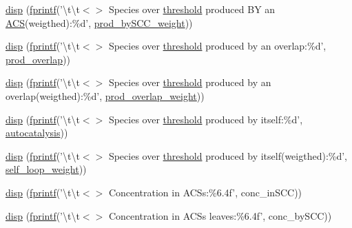 \begin{DoxyCompactItemize}
\item 
\hyperlink{a00022_a41b4972e38813d1f738a978731ed2af8}{disp} (\hyperlink{a00062_aa6dc40efe43a338c9ff278260d95b4d9}{fprintf}('\textbackslash{}t\textbackslash{}t$<$$>$ Species over \hyperlink{a00030_aa022cbb28f80299d572def08e7a5ccfd}{threshold} produced B\-Y an \hyperlink{a00022_ad72e1068795c577213481e5db7f3e925}{A\-C\-S}(weigthed)\-:\%d', \hyperlink{a00022_aac9f4f22f537f0fc5fd69163676333af}{prod\-\_\-by\-S\-C\-C\-\_\-weight}))
\item 
\hyperlink{a00022_a752b7252b1ef2602fab9837af43329ea}{disp} (\hyperlink{a00062_aa6dc40efe43a338c9ff278260d95b4d9}{fprintf}('\textbackslash{}t\textbackslash{}t$<$$>$ Species over \hyperlink{a00030_aa022cbb28f80299d572def08e7a5ccfd}{threshold} produced by an overlap\-:\%d', \hyperlink{a00022_a0aa4c3fee8d2729e5b7aa511a3100685}{prod\-\_\-overlap}))
\item 
\hyperlink{a00022_ad632c0885d2430334c173c9a51a44dcb}{disp} (\hyperlink{a00062_aa6dc40efe43a338c9ff278260d95b4d9}{fprintf}('\textbackslash{}t\textbackslash{}t$<$$>$ Species over \hyperlink{a00030_aa022cbb28f80299d572def08e7a5ccfd}{threshold} produced by an overlap(weigthed)\-:\%d', \hyperlink{a00022_a75fbcaf1e595fc3264e0cba051e4ba02}{prod\-\_\-overlap\-\_\-weight}))
\item 
\hyperlink{a00022_a8daa491270543da374f7184e009ca072}{disp} (\hyperlink{a00062_aa6dc40efe43a338c9ff278260d95b4d9}{fprintf}('\textbackslash{}t\textbackslash{}t$<$$>$ Species over \hyperlink{a00030_aa022cbb28f80299d572def08e7a5ccfd}{threshold} produced by itself\-:\%d', \hyperlink{a00022_a2d0b5f62c8a18e8cbfeb15c6f8856c5a}{autocatalysis}))
\item 
\hyperlink{a00022_a9cf4fc8861436a09b1fb6433963b32c4}{disp} (\hyperlink{a00062_aa6dc40efe43a338c9ff278260d95b4d9}{fprintf}('\textbackslash{}t\textbackslash{}t$<$$>$ Species over \hyperlink{a00030_aa022cbb28f80299d572def08e7a5ccfd}{threshold} produced by itself(weigthed)\-:\%d', \hyperlink{a00022_a8c1a84735122e25dcd5f68a0bf4c312b}{self\-\_\-loop\-\_\-weight}))
\item 
\hyperlink{a00022_a72f8ddb8fbf3b06c29d486baf396072d}{disp} (\hyperlink{a00062_aa6dc40efe43a338c9ff278260d95b4d9}{fprintf}('\textbackslash{}t\textbackslash{}t$<$$>$ Concentration in A\-C\-Ss\-:\%6.\-4f', conc\-\_\-in\-S\-C\-C))
\item 
\hyperlink{a00022_a34bf7a57ea8ae066cf1e5c01b32bdd4d}{disp} (\hyperlink{a00062_aa6dc40efe43a338c9ff278260d95b4d9}{fprintf}('\textbackslash{}t\textbackslash{}t$<$$>$ Concentration in A\-C\-Ss leaves\-:\%6.\-4f', conc\-\_\-by\-S\-C\-C))
$$
\end{DoxyCompactItemize}
